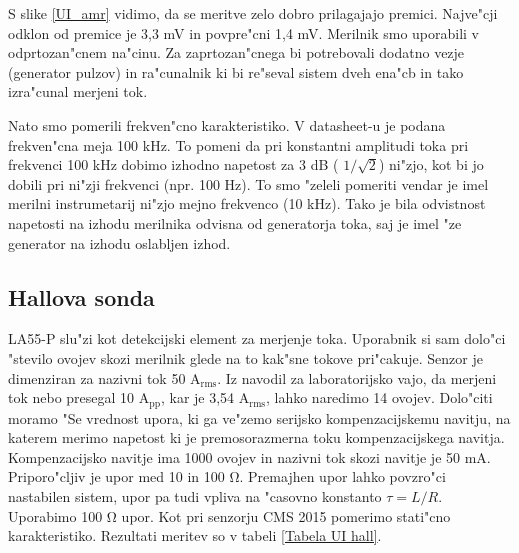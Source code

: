 \documentclass[10pt,a4paper]{article}
\begin{document}
	
	S slike \ref{UI_amr} vidimo, da se meritve zelo dobro prilagajajo premici. Najve"cji odklon od premice je 3,3 mV in povpre"cni 1,4 mV. Merilnik smo uporabili v odprtozan"cnem na"cinu. Za zaprtozan"cnega bi potrebovali dodatno vezje (generator pulzov) in ra"cunalnik ki bi re"seval sistem dveh ena"cb in tako izra"cunal merjeni tok.
	
	Nato smo pomerili frekven"cno karakteristiko. V datasheet-u je podana frekven"cna meja 100 kHz. To pomeni da pri konstantni amplitudi toka pri frekvenci 100 kHz dobimo izhodno napetost za 3 dB ( $1/\sqrt{2}$) ni"zjo, kot bi jo dobili pri ni"zji frekvenci (npr. 100 Hz). To smo "zeleli pomeriti vendar je imel merilni instrumetarij ni"zjo mejno frekvenco (10 kHz). Tako je bila odvistnost napetosti na izhodu merilnika odvisna od generatorja toka, saj je imel "ze generator na izhodu oslabljen izhod.
	
	
	\subsection{Hallova sonda}
	
	
	LA55-P slu"zi kot detekcijski element za merjenje toka. Uporabnik si sam dolo"ci "stevilo ovojev skozi merilnik glede na to kak"sne tokove pri"cakuje. Senzor je dimenziran za nazivni tok  50 $\mathrm{A_{rms}}$. Iz navodil za laboratorijsko vajo, da merjeni tok nebo presegal 10 $\mathrm{A_{pp}}$, kar je 3,54 $\mathrm{A_{rms}}$, lahko naredimo 14 ovojev. Dolo"citi moramo "Se vrednost upora, ki ga ve"zemo serijsko kompenzacijskemu navitju, na katerem merimo napetost ki je premosorazmerna toku kompenzacijskega navitja. Kompenzacijsko navitje ima 1000 ovojev in nazivni tok skozi navitje je 50 mA. Priporo"cljiv je upor med 10 in 100 $\mathrm{\Omega}$. Premajhen upor lahko povzro"ci nastabilen sistem, upor pa tudi vpliva na "casovno konstanto $\tau=L/R$. Uporabimo 100 $\mathrm{\Omega}$ upor. Kot pri senzorju CMS 2015 pomerimo stati"cno karakteristiko. Rezultati meritev so v tabeli \ref{Tabela UI hall}.
	
\end{document}
